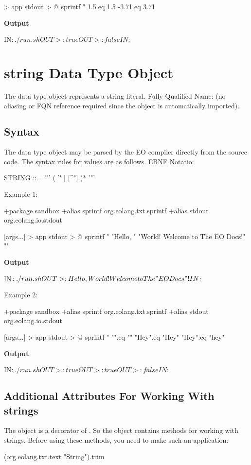 \documentclass[12pt]{book}
\begin{document}
{\begin{ffcode}
[args...] > app
  stdout > @
    sprintf
      "%
      1.5.eq 1.5
      -3.71.eq 3.71
\end{ffcode}
\textbf{Output}
\begin{ffcode}
IN$: ./run.sh
OUT>: true
OUT>: false
IN$: 
\end{ffcode}

\section{string Data Type Object}
The  data type object represents a string literal.
Fully Qualified Name:  (no aliasing or FQN reference required since the object is automatically imported).

\subsection{Syntax}
The  data type object may be parsed by the EO compiler directly from the source code. The syntax rules for values are as follows. EBNF Notatio:
\begin{ffcode}

STRING   ::= '"' ( '\"' | [^"] )* '"'
\end{ffcode}
Example 1:
\begin{ffcode}
+package sandbox
+alias sprintf org.eolang.txt.sprintf
+alias stdout org.eolang.io.stdout

[args...] > app
  stdout > @
    sprintf
      "%
      "Hello, "
      "World! Welcome to The \"EO Docs\"!"
      "\n"
\end{ffcode}
\textbf{Output}
\begin{ffcode}
IN$: ./run.sh
OUT>: Hello, World! Welcome to The "EO Docs"!
IN$: 
\end{ffcode}
Example 2:
\begin{ffcode}
+package sandbox
+alias sprintf org.eolang.txt.sprintf
+alias stdout org.eolang.io.stdout

[args...] > app
  stdout > @
    sprintf
      "%
      "".eq ""
      "Hey".eq "Hey"
      "Hey".eq "hey"
\end{ffcode}
\textbf{Output} 
\begin{ffcode}
IN$: ./run.sh
OUT>: true
OUT>: true
OUT>: false
IN$: 
\end{ffcode}

\subsection{Additional Attributes For Working With strings}
The object  is a decorator of . So the  object contains methods for working with strings. Before using these methods, you need to make such an application:
\begin{ffcode}
(org.eolang.txt.text "String").trim
\end{ffcode}

}
\end{document}
